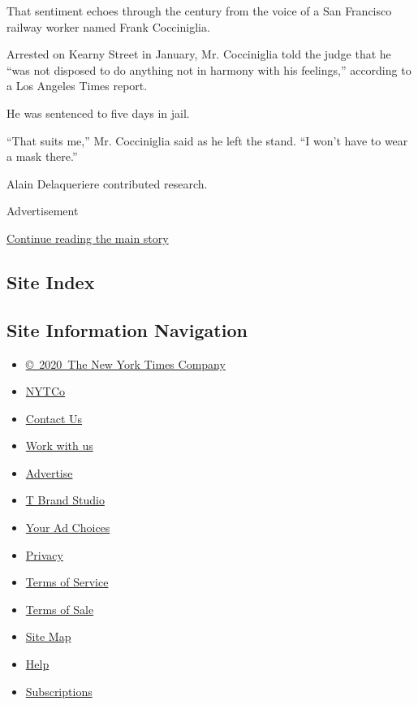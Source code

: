 That sentiment echoes through the century from the voice of a San
Francisco railway worker named Frank Cocciniglia.

Arrested on Kearny Street in January, Mr. Cocciniglia told the judge
that he ``was not disposed to do anything not in harmony with his
feelings,'' according to a Los Angeles Times report.

He was sentenced to five days in jail.

``That suits me,'' Mr. Cocciniglia said as he left the stand. ``I won't
have to wear a mask there.''

Alain Delaqueriere contributed research.

Advertisement

\protect\hyperlink{after-bottom}{Continue reading the main story}

\hypertarget{site-index}{%
\subsection{Site Index}\label{site-index}}

\hypertarget{site-information-navigation}{%
\subsection{Site Information
Navigation}\label{site-information-navigation}}

\begin{itemize}
\tightlist
\item
  \href{https://help.nytimes.com/hc/en-us/articles/115014792127-Copyright-notice}{©~2020~The
  New York Times Company}
\end{itemize}

\begin{itemize}
\tightlist
\item
  \href{https://www.nytco.com/}{NYTCo}
\item
  \href{https://help.nytimes.com/hc/en-us/articles/115015385887-Contact-Us}{Contact
  Us}
\item
  \href{https://www.nytco.com/careers/}{Work with us}
\item
  \href{https://nytmediakit.com/}{Advertise}
\item
  \href{http://www.tbrandstudio.com/}{T Brand Studio}
\item
  \href{https://www.nytimes.com/privacy/cookie-policy\#how-do-i-manage-trackers}{Your
  Ad Choices}
\item
  \href{https://www.nytimes.com/privacy}{Privacy}
\item
  \href{https://help.nytimes.com/hc/en-us/articles/115014893428-Terms-of-service}{Terms
  of Service}
\item
  \href{https://help.nytimes.com/hc/en-us/articles/115014893968-Terms-of-sale}{Terms
  of Sale}
\item
  \href{https://spiderbites.nytimes.com}{Site Map}
\item
  \href{https://help.nytimes.com/hc/en-us}{Help}
\item
  \href{https://www.nytimes.com/subscription?campaignId=37WXW}{Subscriptions}
\end{itemize}
